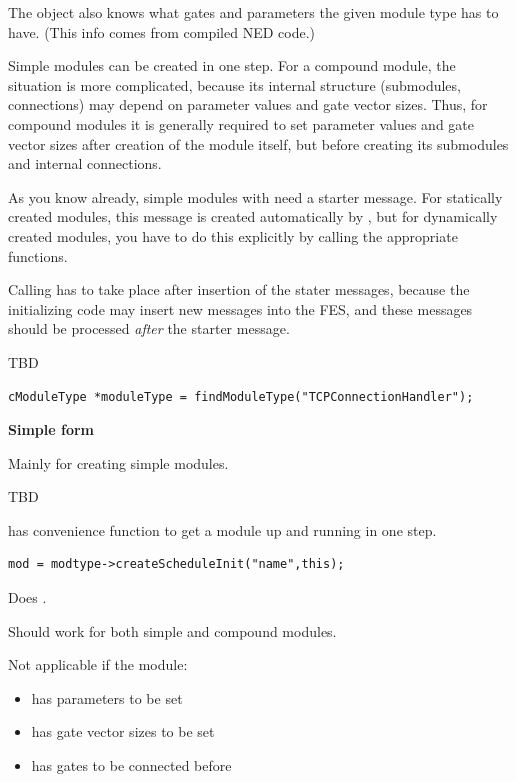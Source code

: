 The  object also knows what gates and
parameters the given module type has to have. (This info comes from
compiled NED code.)


Simple modules can be created in one step. For a compound module, the
situation is more complicated, because its internal structure
(submodules, connections) may depend on parameter values and gate
vector sizes. Thus, for compound modules it is generally required to
set parameter values and gate vector sizes after creation of the
module itself, but before creating its submodules and internal
connections.


As you know already, simple modules with  need a
starter message. For statically created
modules, this message is created automatically by {\opp}, but for
dynamically created modules, you have to do this explicitly by calling
the appropriate functions.


Calling  has to take place after insertion of the
stater messages, because the initializing code may insert new messages
into the FES, and these messages should be processed
\textit{after} the starter message.

TBD

\begin{Verbatim}
cModuleType *moduleType = findModuleType("TCPConnectionHandler");
\end{Verbatim}


\textbf{Simple form}


Mainly for creating simple modules.

TBD


 has
 convenience function to get a module up and
running in one step.

\begin{Verbatim}
mod = modtype->createScheduleInit("name",this);
\end{Verbatim}

Does
.


Should work for both simple and compound modules.


Not applicable if the module:
\begin{itemize}
\item{has parameters to be set}
\item{has gate vector sizes to be set}
\item{has gates to be connected before }
\end{itemize}

